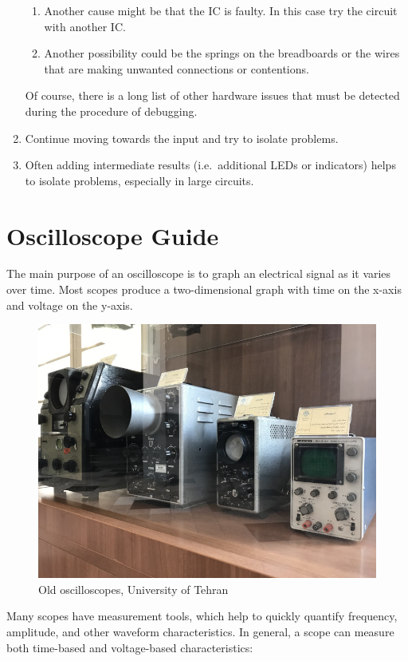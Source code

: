 \documentclass[12pt, logo=tehranDLDL/ut]{tehranDLDL}
\begin{document}
\begin{enumerate}
\begin{enumerate}
        \item Another cause might be that the IC is faulty. In this case try the circuit with another IC. 
        \item Another possibility could be the springs on the breadboards or the wires that are making unwanted connections or contentions.
    \end{enumerate}
    Of course, there is a long list of other hardware issues that must be detected during the procedure of debugging. 
    \item Continue moving towards the input and try to isolate problems.
    \item Often adding intermediate results (i.e.\ additional LEDs or indicators) helps to isolate problems, especially in large circuits.
\end{enumerate}

\section{Oscilloscope Guide}

The main purpose of an oscilloscope is to graph an electrical signal as it varies over time. Most scopes produce a two-dimensional graph with time on the x-axis and voltage on the y-axis.

\begin{figure}
    \centering
    \caption{Old oscilloscopes, University of Tehran}
    \includegraphics[width=0.7\linewidth]{oscilloscope}
\end{figure}

Many scopes have measurement tools, which help to quickly quantify frequency, amplitude, and other waveform characteristics. In general, a scope can measure both time-based and voltage-based characteristics:
\end{document}
